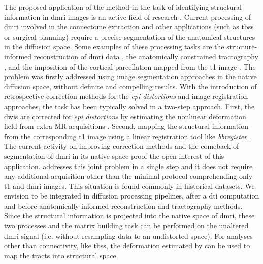 The proposed application of the method in the task of identifying structural information
  in \gls*{dmri} images is an active field of research \citep{jeurissen_tissuetype_2015}.
Current processing of \gls{dmri} involved in the connectome extraction and other applications
  (such as \gls*{tbss} or surgical planning) require a precise segmentation
  of the anatomical structures in the diffusion space.
Some examples of these processing tasks are the structure-informed reconstruction of \gls*{dmri}
  data \citep{jeurissen_multitissue_2014,daducci_accelerated_2015}, the anatomically constrained
  tractography \citep{smith_anatomicallyconstrained_2012}, and the imposition of the cortical
  parcellation mapped from the \gls*{t1} image \citep{hagmann_mapping_2008}.
The problem was firstly addressed using image segmentation approaches in the native diffusion
  space, without definite and compelling results.
With the introduction of retrospective correction methods for the \emph{\gls*{epi} distortions}
  and image registration approaches, the task has been typically solved in a two-step approach.
First, the \glspl*{dwi} are corrected for \emph{\gls*{epi} distortions} by estimating
  the nonlinear deformation field from extra MR acquisitions
  \citep{jezzard_correction_1995,chiou_simple_2000,cordes_geometric_2000,kybic_unwarping_2000}.
Second, mapping the structural information from the corresponding \gls*{t1} image
  using a linear registration tool like \emph{bbregister} \citep{greve_accurate_2009}.
The current activity on improving correction methods \citep{irfanoglu_drbuddi_2015} and
  the comeback of segmentation of \gls*{dmri} in its native space
  \citep{jeurissen_tissuetype_2015} proof the open interest of this application.
\Regseg{} addresses this joint problem in a single step and it does not require any additional
  acquisition other than the minimal protocol comprehending only \gls*{t1} and \gls*{dmri} images.
This situation is found commonly in historical datasets.
We envision \regseg{} to be integrated in diffusion processing pipelines, after a 
  \gls*{dti} computation and before anatomically-informed reconstruction and tractography
  methods.
Since the structural information is projected into the native space of \gls*{dmri},
  these two processes and the matrix building task can be performed on the unaltered
  \gls*{dmri} signal (i.e. without resampling data to an undistorted space).
For analyses other than connectivity, like \gls*{tbss}, the deformation estimated by \regseg{}
  can be used to map the tracts into structural space.
